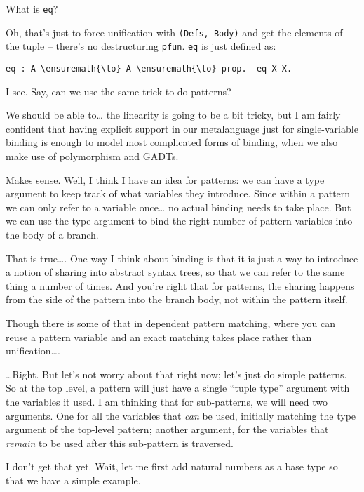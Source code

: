 \heroSTUDENT{} What is \texttt{eq}?

\heroADVISOR{} Oh, that's just to force unification with
\texttt{(Defs,\ Body)} and get the elements of the tuple -- there's no
destructuring \texttt{pfun}. \texttt{eq} is just defined as:

\begin{verbatim}
eq : A \ensuremath{\to} A \ensuremath{\to} prop.  eq X X.
\end{verbatim}

\heroSTUDENT{} I see. Say, can we use the same trick to do patterns?

\heroADVISOR{} We should be able to\ldots{} the linearity is going to be a bit
tricky, but I am fairly confident that having explicit support in our
metalanguage just for single-variable binding is enough to model most
complicated forms of binding, when we also make use of polymorphism and
GADTs.

\heroSTUDENT{} Makes sense. Well, I think I have an idea for patterns: we can
have a type argument to keep track of what variables they introduce.
Since within a pattern we can only refer to a variable once\ldots{} no
actual binding needs to take place. But we can use the type argument to
bind the right number of pattern variables into the body of a branch.

\heroADVISOR{} That is true\ldots{}. One way I think about binding is that it
is just a way to introduce a notion of sharing into abstract syntax
trees, so that we can refer to the same thing a number of times. And
you're right that for patterns, the sharing happens from the side of the
pattern into the branch body, not within the pattern itself.

\heroSTUDENT{} Though there is some of that in dependent pattern matching,
where you can reuse a pattern variable and an exact matching takes place
rather than unification\ldots{}.

\heroADVISOR{} \ldots{}Right. But let's not worry about that right now; let's
just do simple patterns. So at the top level, a pattern will just have a
single ``tuple type'' argument with the variables it used. I am thinking
that for sub-patterns, we will need two arguments. One for all the
variables that \emph{can} be used, initially matching the type argument
of the top-level pattern; another argument, for the variables that
\emph{remain} to be used after this sub-pattern is traversed.

\heroSTUDENT{} I don't get that yet. Wait, let me first add natural numbers as
a base type so that we have a simple example.

